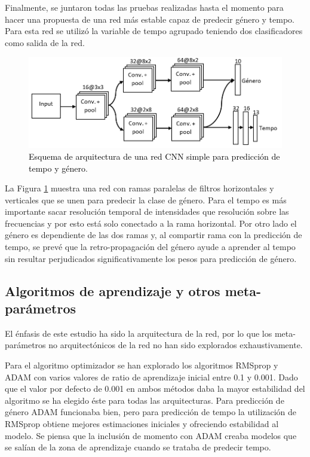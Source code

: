 Finalmente, se juntaron todas las pruebas realizadas hasta el momento para hacer una propuesta de una red más estable capaz de predecir género y tempo. Para esta red se utilizó la variable de tempo agrupado teniendo dos clasificadores como salida de la red.

\begin{figure}[htb]
  \centering
  \includegraphics[width=\textwidth]{Figures/arquitectura_mix.png}
  \caption{\textcolor{black}{Esquema de arquitectura de una red CNN simple para predicción de tempo y género}.}
  \label{Fig:arquitectura_mix}
\end{figure}

La Figura \ref{Fig:arquitectura_mix} muestra una red con ramas paralelas de filtros horizontales y verticales que se unen para predecir la clase de género. Para el tempo es más importante sacar resolución temporal de intensidades que resolución sobre las frecuencias y por esto está solo conectado a la rama horizontal. Por otro lado el género es dependiente de las dos ramas y, al compartir rama con la predicción de tempo, se prevé que la retro-propagación del género ayude a aprender al tempo sin resultar perjudicados significativamente los pesos para predicción de género.

\subsection{Algoritmos de aprendizaje y otros meta-parámetros}\label{sec:metaparametros}
\noindent El énfasis de este estudio ha sido la arquitectura de la red, por lo que los meta-parámetros no arquitectónicos de la red no han sido explorados exhaustivamente. 

Para el algoritmo optimizador se han explorado los algoritmos RMSprop y ADAM con varios valores de ratio de aprendizaje inicial entre 0.1 y 0.001. Dado que el valor por defecto de 0.001 en ambos métodos daba la mayor estabilidad del algoritmo se ha elegido éste para todas las arquitecturas. Para predicción de género ADAM funcionaba bien, pero para predicción de tempo la utilización de RMSprop obtiene mejores estimaciones iniciales y ofreciendo estabilidad al modelo. Se piensa que la inclusión de momento con ADAM creaba modelos que se salían de la zona de aprendizaje cuando se trataba de predecir tempo.

